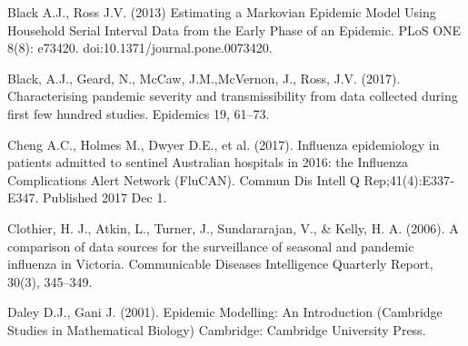 \begin{thebibliography}{99}
	 Black A.J., Ross J.V. (2013) Estimating a Markovian Epidemic Model Using Household Serial Interval Data from the Early Phase of an Epidemic. PLoS ONE 8(8): e73420. doi:10.1371/journal.pone.0073420.
	
	
	 Black, A.J., Geard, N., McCaw, J.M.,McVernon, J., Ross, J.V. (2017). Characterising pandemic severity and transmissibility from data collected during first few hundred studies. Epidemics 19, 61–73.
	
	
	
	
	
	
	 Cheng A.C., Holmes M., Dwyer D.E., et al. (2017). Influenza epidemiology in patients admitted to sentinel Australian hospitals in 2016: the Influenza Complications Alert Network (FluCAN). Commun Dis Intell Q Rep;41(4):E337‐E347. Published 2017 Dec 1.
	
	 Clothier, H. J., Atkin, L., Turner, J., Sundararajan, V., \& Kelly, H. A. (2006). A comparison of data sources for the surveillance of seasonal and pandemic influenza in Victoria. Communicable Diseases Intelligence Quarterly Report, 30(3), 345–349.
		
	 Daley D.J., Gani J. (2001). Epidemic Modelling: An Introduction (Cambridge Studies in Mathematical Biology) Cambridge: Cambridge University Press.
	

\end{thebibliography}
